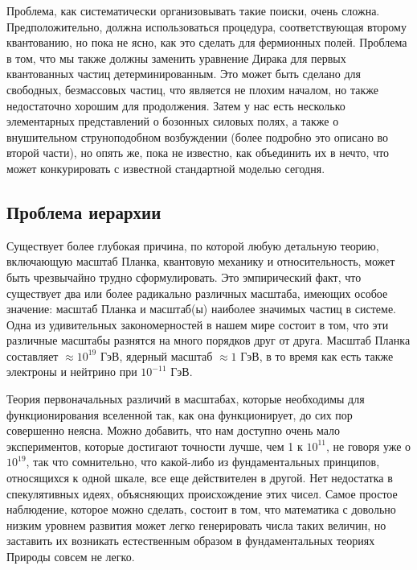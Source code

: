 \documentclass[main.tex]{subfiles}
\begin{document}
Проблема, как систематически организовывать такие поиски, очень сложна. Предположительно, должна использоваться процедура, соответствующая второму квантованию, но пока не ясно, как это сделать для фермионных полей. Проблема в том, что мы также должны заменить уравнение Дирака для первых квантованных частиц детерминированным. Это может быть сделано для свободных, безмассовых частиц, что является не плохим началом, но также недостаточно хорошим для продолжения. Затем у нас есть несколько элементарных представлений о бозонных силовых полях, а также о внушительном струноподобном возбуждении (более подробно это описано во второй части), но опять же, пока не известно, как объединить их в нечто, что может конкурировать с известной стандартной моделью сегодня.

\subsection{Проблема иерархии}\label{ch8.2}

Существует более глубокая причина, по которой любую детальную теорию, включающую масштаб Планка, квантовую механику и относительность, может быть чрезвычайно трудно сформулировать. Это эмпирический факт, что существует два или более радикально различных масштаба, имеющих особое значение: масштаб Планка и масштаб(ы) наиболее значимых частиц в системе. Одна из удивительных закономерностей в нашем мире состоит в том, что эти различные масштабы разнятся на много порядков друг от друга. Масштаб Планка составляет $\approx 10^{19}$ ГэВ, ядерный масштаб $\approx 1$ ГэВ, в то время как есть также электроны и нейтрино при $ 10^{-11}$ ГэВ.

Теория первоначальных различий в масштабах, которые необходимы для функционирования вселенной так, как она функционирует, до сих пор совершенно неясна. Можно добавить, что нам доступно очень мало экспериментов, которые достигают точности лучше, чем 1 к $10^{11}$, не говоря уже о $10^{19}$, так что сомнительно, что какой-либо из фундаментальных принципов, относящихся к одной шкале, все еще действителен в другой. Нет недостатка в спекулятивных идеях, объясняющих происхождение этих чисел. Самое простое наблюдение, которое можно сделать, состоит в том, что математика с довольно низким уровнем развития может легко генерировать числа таких величин, но заставить их возникать естественным образом в фундаментальных теориях Природы совсем не легко.
\end{document}
